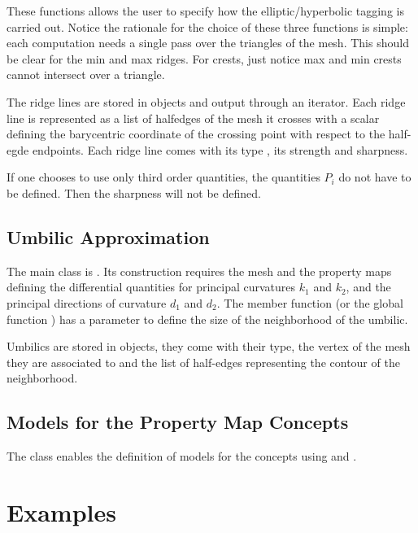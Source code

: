 These functions allows the user to specify how the elliptic/hyperbolic
tagging is carried out.
Notice the rationale for the choice of these three functions is
simple: each computation needs a single pass over the triangles of the
mesh. This should be clear for the min and max ridges. For crests,
just notice max and min crests cannot intersect over a triangle.
\medskip

The ridge lines are stored in
 objects and output through an iterator. 
Each ridge line is represented as a list of halfedges of the mesh it
crosses with a scalar defining the barycentric coordinate of the
crossing point with respect to the half-egde endpoints. Each ridge
line comes with its type , its strength and sharpness.

If one chooses to use only third order quantities, the quantities
$P_i$ do not have to be defined. Then the sharpness will not be
defined.

\subsection{Umbilic Approximation}
The main class is
.
Its construction requires the mesh and the property maps defining the
differential quantities for principal curvatures $k_1$ and $k_2$, and
the principal directions of curvature $d_1$ and $d_2$.  The member
function  (or the global function )
has a parameter to define the size of the neighborhood of the umbilic.

Umbilics are stored in  objects, they come with their
type, the vertex of the mesh they are associated to and the list of
half-edges representing the contour of the neighborhood.


\subsection{Models for the Property Map Concepts}
The class
enables the definition of models for the concepts
using  and .


\section{Examples} 
\label{examples}

